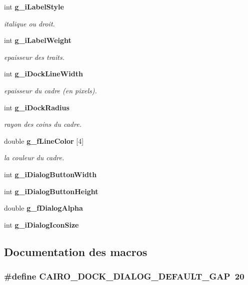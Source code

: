 \begin{CompactItemize}
int {\bf g\_\-i\-Label\-Style}
\begin{CompactList}\small\item\em italique ou droit. \item\end{CompactList}\item 
int {\bf g\_\-i\-Label\-Weight}
\begin{CompactList}\small\item\em epaisseur des traits. \item\end{CompactList}\item 
int {\bf g\_\-i\-Dock\-Line\-Width}
\begin{CompactList}\small\item\em epaisseur du cadre (en pixels). \item\end{CompactList}\item 
int {\bf g\_\-i\-Dock\-Radius}
\begin{CompactList}\small\item\em rayon des coins du cadre. \item\end{CompactList}\item 
double {\bf g\_\-f\-Line\-Color} [4]
\begin{CompactList}\small\item\em la couleur du cadre. \item\end{CompactList}\item 
int {\bf g\_\-i\-Dialog\-Button\-Width}
\item 
int {\bf g\_\-i\-Dialog\-Button\-Height}
\item 
double {\bf g\_\-f\-Dialog\-Alpha}
\item 
int {\bf g\_\-i\-Dialog\-Icon\-Size}
\end{CompactItemize}


\subsection{Documentation des macros}
\subsubsection{\setlength{\rightskip}{0pt plus 5cm}\#define CAIRO\_\-DOCK\_\-DIALOG\_\-DEFAULT\_\-GAP~20}\label{cairo-dock-dialogs_8c_46208c2e5268962a858644952c4d7002}


